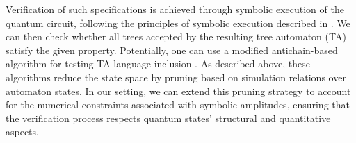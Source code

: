 Verification of such specifications is achieved through symbolic execution of the quantum circuit, following the principles of symbolic execution described in \cite{10.1145/360248.360252}.
%
We can then check whether all trees accepted by the resulting tree automaton (TA) satisfy the given property.
%
Potentially, one can use a modified antichain-based algorithm for testing TA language inclusion \cite{DBLP:conf/tacas/AbdullaCHMV10}.
%
As described above, these algorithms reduce the state space by pruning based on simulation relations over automaton states.
%
In our setting, we can extend this pruning strategy to account for the numerical constraints associated with symbolic amplitudes, ensuring that the verification process respects quantum states' structural and quantitative aspects.
%



